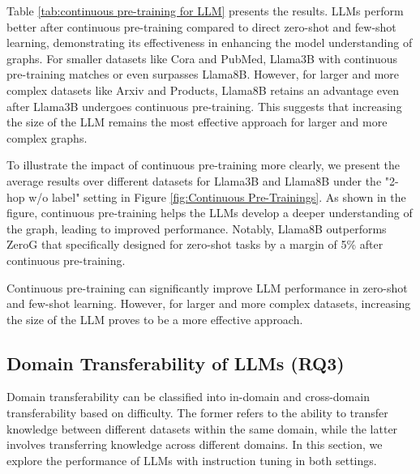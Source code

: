 Table \ref{tab:continuous pre-training for LLM} presents the results. LLMs perform better after continuous pre-training compared to direct zero-shot and few-shot learning, demonstrating its effectiveness in enhancing the model understanding of graphs. For smaller datasets like Cora and PubMed, Llama3B with continuous pre-training matches or even surpasses Llama8B. However, for larger and more complex datasets like Arxiv and Products, Llama8B retains an advantage even after Llama3B undergoes continuous pre-training. This suggests that increasing the size of the LLM remains the most effective approach for larger and more complex graphs. 

To illustrate the impact of continuous pre-training more clearly, we present the average results over different datasets for Llama3B and Llama8B under the "2-hop w/o label" setting in Figure \ref{fig:Continuous Pre-Trainings}. As shown in the figure, continuous pre-training helps the LLMs develop a deeper understanding of the graph, leading to improved performance. Notably, Llama8B outperforms ZeroG that specifically designed for zero-shot tasks by a margin of 5\% after continuous pre-training.

\begin{remark}
Continuous pre-training can significantly improve LLM performance in zero-shot and few-shot learning. However, for larger and more complex datasets, increasing the size of the LLM proves to be a more effective approach.
\end{remark}
\subsection{Domain Transferability of LLMs (RQ3)}
\label{sec:Case 4}
Domain transferability can be classified into in-domain and cross-domain transferability based on difficulty. The former refers to the ability to transfer knowledge between different datasets within the same domain, while the latter involves transferring knowledge across different domains. In this section, we explore the performance of LLMs with instruction tuning in both settings.


